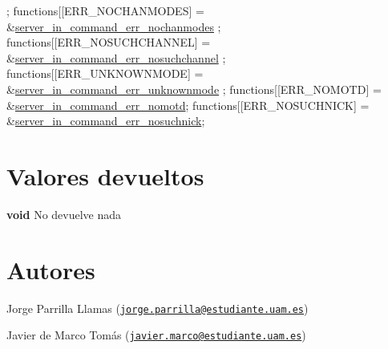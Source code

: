 \begin{DoxyCode}
      ;
functions[[ERR\_NOCHANMODES]            = &\hyperlink{G-2313-06-P2__client__err__handlers_8h_aade31864807344a9961ffdab697b5727}{server\_in\_command\_err\_nochanmodes}
      ;
functions[[ERR\_NOSUCHCHANNEL]          = &\hyperlink{G-2313-06-P2__client__err__handlers_8h_a83109e15e2a8f93c9523a84a546098c0}{server\_in\_command\_err\_nosuchchannel}
      ;
functions[[ERR\_UNKNOWNMODE]            = &\hyperlink{G-2313-06-P2__client__err__handlers_8h_af262f3569e06c21e3e466266fa4e2c80}{server\_in\_command\_err\_unknownmode}
      ;
functions[[ERR\_NOMOTD]                 = &\hyperlink{G-2313-06-P2__client__err__handlers_8h_a678f368edc1fd437f5f115ef897bdcd9}{server\_in\_command\_err\_nomotd};
functions[[ERR\_NOSUCHNICK]             = &\hyperlink{G-2313-06-P2__client__err__handlers_8h_a01f8c9822aac18d5424ebbaf67c06a51}{server\_in\_command\_err\_nosuchnick};
\end{DoxyCode}
\hypertarget{client_execute_in_function_return_4}{}\section{Valores devueltos}\label{client_execute_in_function_return_4}

\begin{DoxyItemize}
\item {\bfseries void} No devuelve nada 
\end{DoxyItemize}\hypertarget{client_execute_in_function_authors_4}{}\section{Autores}\label{client_execute_in_function_authors_4}

\begin{DoxyItemize}
\item Jorge Parrilla Llamas (\href{mailto:jorge.parrilla@estudiante.uam.es}{\tt jorge.\+parrilla@estudiante.\+uam.\+es}) 
\item Javier de Marco Tomás (\href{mailto:javier.marco@estudiante.uam.es}{\tt javier.\+marco@estudiante.\+uam.\+es}) 
\end{DoxyItemize}